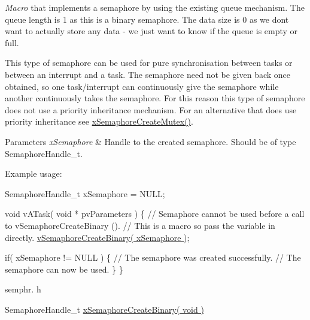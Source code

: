 {\itshape Macro} that implements a semaphore by using the existing queue mechanism. The queue length is 1 as this is a binary semaphore. The data size is 0 as we don\textquotesingle{}t want to actually store any data -\/ we just want to know if the queue is empty or full.

This type of semaphore can be used for pure synchronisation between tasks or between an interrupt and a task. The semaphore need not be given back once obtained, so one task/interrupt can continuously \textquotesingle{}give\textquotesingle{} the semaphore while another continuously \textquotesingle{}takes\textquotesingle{} the semaphore. For this reason this type of semaphore does not use a priority inheritance mechanism. For an alternative that does use priority inheritance see \hyperlink{vendor_2ceedling_2plugins_2freertos_2src_2freertos_2include_2semphr_8h_aa6a00aa9b91a9e5b3ebe4ae1c3f115c6}{x\+Semaphore\+Create\+Mutex()}.


\begin{DoxyParams}{Parameters}
{\em x\+Semaphore} & Handle to the created semaphore. Should be of type Semaphore\+Handle\+\_\+t.\\
\hline
\end{DoxyParams}
Example usage\+: 
\begin{DoxyPre}
SemaphoreHandle\_t xSemaphore = NULL;\end{DoxyPre}



\begin{DoxyPre}void vATask( void * pvParameters )
\{
   // Semaphore cannot be used before a call to vSemaphoreCreateBinary ().
   // This is a macro so pass the variable in directly.
   \hyperlink{vendor_2ceedling_2plugins_2freertos_2src_2freertos_2include_2semphr_8h_ae10bffadd26fbd5bcce76bf33a83ef30}{vSemaphoreCreateBinary( xSemaphore )};\end{DoxyPre}



\begin{DoxyPre}   if( xSemaphore != NULL )
   \{
       // The semaphore was created successfully.
       // The semaphore can now be used.
   \}
\}
\end{DoxyPre}


semphr. h 
\begin{DoxyPre}SemaphoreHandle\_t \hyperlink{vendor_2ceedling_2plugins_2freertos_2src_2freertos_2include_2semphr_8h_acba963695e4f159d9bfa2394cae5badc}{xSemaphoreCreateBinary( void )}\end{DoxyPre}


